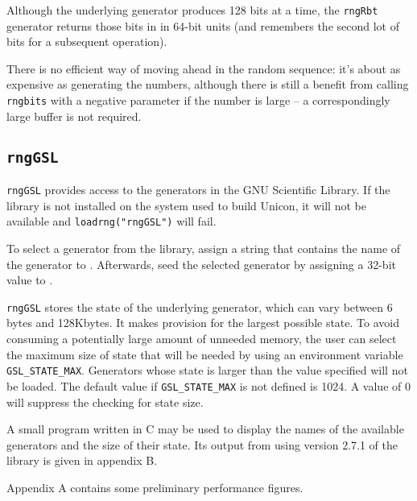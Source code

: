\documentclass[letterpaper,12pt]{article}
\begin{document}
Although the underlying generator produces 128 bits at a time, the \texttt{rngRbt}
generator returns those bits in in 64-bit units (and remembers the second lot of bits for
a subsequent operation).

There is no efficient way of moving ahead in the random sequence: it's about as expensive
as generating the numbers, although there is still a benefit from calling \texttt{rngbits}
with a negative parameter if the number is large -- a correspondingly large buffer is not
required.

\subsection{\texttt{rngGSL}}

\texttt{rngGSL} provides access to the generators in the GNU Scientific
Library\cite{GnuScientificLibrary}. If the library is not installed on the system used to
build Unicon, it will not be available and \texttt{loadrng("rngGSL")} will fail.

To select a generator from the library, assign a string that contains the name of the
generator to \rndkwd. Afterwards, seed the selected generator by assigning a 32-bit value to
\rndkwd.

\texttt{rngGSL} stores the state of the underlying generator, which can vary between 6
bytes and 128Kbytes. It makes provision for the largest possible state.  To avoid
consuming a potentially large amount of unneeded memory, the user can select the maximum
size of state that will be needed by using an environment variable
\texttt{GSL\_STATE\_MAX}. Generators whose state is larger than the value specified will
not be loaded.  The default value if \texttt{GSL\_STATE\_MAX} is not defined is 1024. A
value of 0 will suppress the checking for state size.

A small program written in C may be used to display the names of the available generators
and the size of their state. Its output from using version 2.7.1 of the library is given
in appendix B.


 Appendix A contains some preliminary performance figures.
\end{document}
